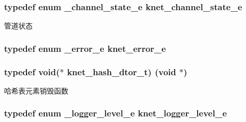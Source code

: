 \subsubsection[{knet\+\_\+channel\+\_\+state\+\_\+e}]{\setlength{\rightskip}{0pt plus 5cm}typedef enum {\bf \+\_\+channel\+\_\+state\+\_\+e}  {\bf knet\+\_\+channel\+\_\+state\+\_\+e}}\label{a00051_a74ff83eaafca5c7093accdc65c6b0646_a74ff83eaafca5c7093accdc65c6b0646}
管道状态 \hypertarget{a00051_abc9a047a9545c201adf70e4793ed0689_abc9a047a9545c201adf70e4793ed0689}{}
\subsubsection[{knet\+\_\+error\+\_\+e}]{\setlength{\rightskip}{0pt plus 5cm}typedef enum {\bf \+\_\+error\+\_\+e}  {\bf knet\+\_\+error\+\_\+e}}\label{a00051_abc9a047a9545c201adf70e4793ed0689_abc9a047a9545c201adf70e4793ed0689}
\hypertarget{a00051_af806592520383146be2f3aac316beb45_af806592520383146be2f3aac316beb45}{}
\subsubsection[{knet\+\_\+hash\+\_\+dtor\+\_\+t}]{\setlength{\rightskip}{0pt plus 5cm}typedef void($\ast$ knet\+\_\+hash\+\_\+dtor\+\_\+t) (void $\ast$)}\label{a00051_af806592520383146be2f3aac316beb45_af806592520383146be2f3aac316beb45}
哈希表元素销毁函数 \hypertarget{a00051_a8bb61ec2ff976625d0707a81c1ccc149_a8bb61ec2ff976625d0707a81c1ccc149}{}
\subsubsection[{knet\+\_\+logger\+\_\+level\+\_\+e}]{\setlength{\rightskip}{0pt plus 5cm}typedef enum {\bf \+\_\+logger\+\_\+level\+\_\+e}  {\bf knet\+\_\+logger\+\_\+level\+\_\+e}}\label{a00051_a8bb61ec2ff976625d0707a81c1ccc149_a8bb61ec2ff976625d0707a81c1ccc149}
\hypertarget{a00051_a3ad8e017e53143bca2ada78d2bfa30e1_a3ad8e017e53143bca2ada78d2bfa30e1}{}
